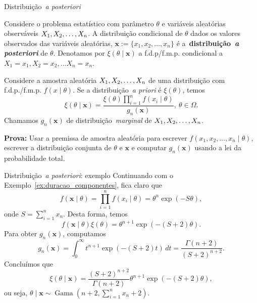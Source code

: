 \begin{frame}{Distribuição~\textit{a posteriori}}
\begin{defn}
 \label{def:posterior}
 Considere o problema estatístico com parâmetro $\theta$ e variáveis aleatórias observáveis $X_1, X_2, \ldots, X_n$.
 A distribuição condicional de $\theta$ dados os valores observados das variáveis aleatórias, $\boldsymbol x := \{x_1, x_2, \ldots, x_n \}$ é a~\textbf{distribuição~\textit{a posteriori}} de $\theta$.
 Denotamos por $\xi(\theta \mid \boldsymbol x)$ a f.d.p/f.m.p. condicional a $X_1 = x_1, X_2 = x_2, \ldots X_n = x_n$.
\end{defn}
\begin{theo}
 \label{thm:posterior_distribution}
 Considere a amostra aleatória $X_1, X_2, \ldots, X_n$ de uma distribuição com f.d.p./f.m.p. $f(x\mid\theta)$.
 Se a distribuição~\textit{a priori} é $\xi(\theta)$, temos
 \begin{equation}
  \label{eq:posterior}
    \xi(\theta \mid \boldsymbol x) = \frac{\xi(\theta)\prod_{i=1}^n f(x_i \mid \theta)}{g_n(\boldsymbol x)}, \: \theta \in \Omega.  
 \end{equation}
 Chamamos $g_n(\boldsymbol x)$ de distribuição~\textit{marginal} de $X_1, X_2, \ldots, X_n$.
\end{theo}
\textbf{Prova:} Usar a premissa de amostra aleatória para escrever $f(x_1, x_2, \ldots, x_n \mid \theta)$, escrever a distribuição conjunta de $\theta$ e $\boldsymbol x$ e computar $g_n(\boldsymbol x)$ usando a lei da probabilidade total. 
\end{frame}
\begin{frame}{Distribuição~\textit{a posteriori}: exemplo}
Continuando com o Exemplo~\ref{ex:duracao_componentes}, fica claro que 
 \[f (\boldsymbol x  \mid \theta) = \prod_{i=1}^n f(x_i \mid \theta) = \theta^n\exp(-S\theta), \]
onde $S = \sum_{i = 1}^n x_n$.
Desta forma, temos 
\[ f (\boldsymbol x  \mid \theta)\xi(\theta) = \theta^{n+1}\exp(-(S + 2)\theta).\]
Para obter $g_n(\boldsymbol{x})$, computamos 
\[ g_n(\boldsymbol{x}) = \int_0^\infty t^{n+1}\exp(-(S + 2)t) \,dt = \frac{\Gamma( n + 2) }{ (S + 2)^{n + 2}}. \]
Concluímos que 
\[\xi(\theta \mid \boldsymbol{x}) = \frac{(S + 2)^{n + 2}}{\Gamma( n + 2)} \theta^{n+1}\exp(-(S + 2)\theta),  \]
ou seja, $\theta \mid \boldsymbol{x} \sim \operatorname{Gama}(n + 2, \sum_{i = 1}^n x_n + 2)$.
\end{frame}
